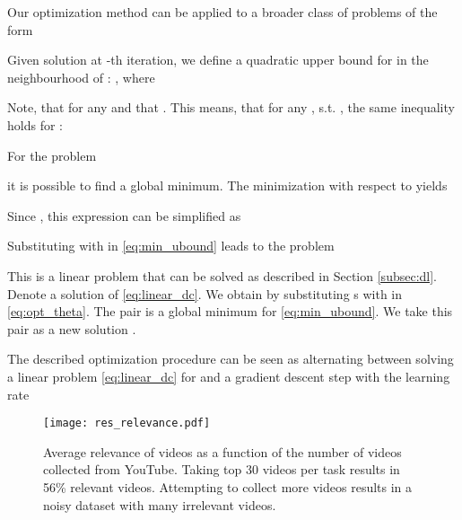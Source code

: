 \documentclass[10pt,twocolumn,letterpaper]{article}
\begin{document}
Our optimization method can be applied to a broader class of problems of the form


\noindent Given solution  at -th iteration, we define a quadratic upper bound for  in the neighbourhood of : , where


\noindent Note, that  for any  and that . This means, that for any , s.t. , the same inequality holds for :


\noindent For the problem

it is possible to find a global minimum.
The minimization with respect to  yields


\noindent Since , this expression can be simplified as


\noindent Substituting  with  in \eqref{eq:min_ubound} leads to the problem

This is a linear problem that can be solved as described in Section \ref{subsec:dl}.
Denote  a solution of \eqref{eq:linear_dc}. We obtain  by substituting s with  in \eqref{eq:opt_theta}. The pair  is a global minimum for \eqref{eq:min_ubound}. We take this pair as a new solution .

The described optimization procedure can be seen as alternating between solving a linear problem \eqref{eq:linear_dc} for  and a gradient descent step with the learning rate 



\begin{figure}[t]
\begin{center}
   \texttt{[image: res\_relevance.pdf]}
   \caption{Average relevance of videos as a function of the number of videos collected from YouTube. Taking top 30 videos per task results in 56\% relevant videos. Attempting to collect more videos results in a noisy dataset with many irrelevant videos.}
   \label{fig:relevance}
\end{center}
\vspace{-0.2in}
\end{figure}
\end{document}
